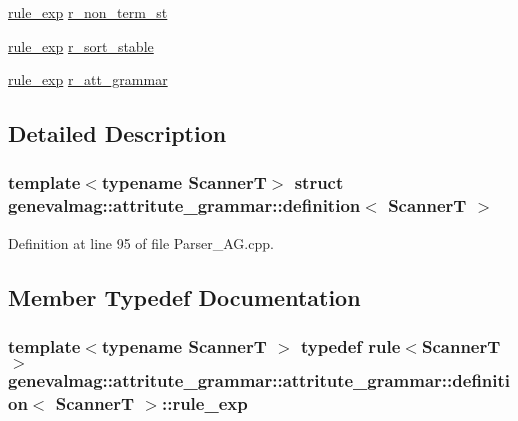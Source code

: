 \begin{CompactItemize}
\item 
\hyperlink{structgenevalmag_1_1attritute__grammar_1_1definition_309e68f77fe3e7c0ebb0f06416bce39c}{rule\_\-exp} \hyperlink{structgenevalmag_1_1attritute__grammar_1_1definition_d615a11fc0fef3ae0d28dd3e07838da6}{r\_\-non\_\-term\_\-st}
\item 
\hyperlink{structgenevalmag_1_1attritute__grammar_1_1definition_309e68f77fe3e7c0ebb0f06416bce39c}{rule\_\-exp} \hyperlink{structgenevalmag_1_1attritute__grammar_1_1definition_f75798f632bc1b7cdd2aa264bad4a642}{r\_\-sort\_\-stable}
\item 
\hyperlink{structgenevalmag_1_1attritute__grammar_1_1definition_309e68f77fe3e7c0ebb0f06416bce39c}{rule\_\-exp} \hyperlink{structgenevalmag_1_1attritute__grammar_1_1definition_45a4f4243bf8c5d050f4bbb4c95a8646}{r\_\-att\_\-grammar}
\end{CompactItemize}


\subsection{Detailed Description}
\subsubsection*{template$<$typename ScannerT$>$ struct genevalmag::attritute\_\-grammar::definition$<$ ScannerT $>$}



Definition at line 95 of file Parser\_\-AG.cpp.

\subsection{Member Typedef Documentation}
\hypertarget{structgenevalmag_1_1attritute__grammar_1_1definition_309e68f77fe3e7c0ebb0f06416bce39c}{
\subsubsection[{rule\_\-exp}]{\setlength{\rightskip}{0pt plus 5cm}template$<$typename ScannerT $>$ typedef rule$<$ScannerT$>$ genevalmag::attritute\_\-grammar::attritute\_\-grammar::definition$<$ ScannerT $>$::{\bf rule\_\-exp}}}
\label{structgenevalmag_1_1attritute__grammar_1_1definition_309e68f77fe3e7c0ebb0f06416bce39c}




